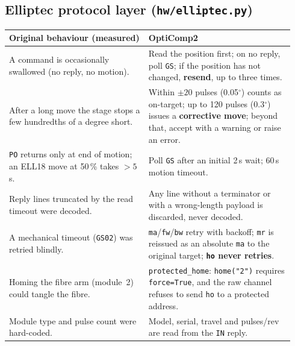 \documentclass[11pt]{article}
\newcommand{\code}[1]{\texttt{\small #1}}
\begin{document}
\subsection{Elliptec protocol layer (\code{hw/elliptec.py})}
\begin{longtable}{>{\raggedright\arraybackslash}p{0.46\linewidth} >{\raggedright\arraybackslash}p{0.48\linewidth}}
\toprule
\textbf{Original behaviour (measured)} & \textbf{OptiComp2} \\
\midrule\endhead
A command is occasionally swallowed (no reply, no motion). &
Read the position first; on no reply, poll \code{GS}; if the position has not changed,
\textbf{resend}, up to three times. \\
After a long move the stage stops a few hundredths of a degree short. &
Within $\pm20$ pulses (0.05$^\circ$) counts as on-target; up to 120 pulses (0.3$^\circ$) issues a
\textbf{corrective move}; beyond that, accept with a warning or raise an error. \\
\code{PO} returns only at end of motion; an ELL18 move at 50\,\% takes $>5$\,s. &
Poll \code{GS} after an initial 2\,s wait; 60\,s motion timeout. \\
Reply lines truncated by the read timeout were decoded. &
Any line without a terminator or with a wrong-length payload is discarded, never decoded. \\
A mechanical timeout (\code{GS02}) was retried blindly. &
\code{ma}/\code{fw}/\code{bw} retry with backoff; \code{mr} is reissued as an absolute \code{ma} to
the original target; \textbf{\code{ho} never retries}. \\
Homing the fibre arm (module~2) could tangle the fibre. &
\code{protected\_home}: \code{home("2")} requires \code{force=True}, and the raw channel refuses to
send \code{ho} to a protected address. \\
Module type and pulse count were hard-coded. &
Model, serial, travel and pulses/rev are read from the \code{IN} reply. \\
\bottomrule
\end{longtable}
\end{document}
